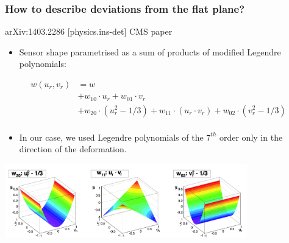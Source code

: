 \documentclass{beamer}
\begin{document}
\begin{frame}
  \frametitle{How to describe deviations from the flat plane?}

  \vspace{-0.3cm}
  \begin{block}{arXiv:1403.2286 [physics.ins-det] CMS paper}
    \begin{itemize}
      \item Sensor shape parametrised as a sum of products of modified Legendre polynomials:
    \end{itemize}
    \vspace{-0.2cm}
    \[
      \begin{array}{rl}
          w(u_r,v_r) &= w \\ 
                     &+ w_{10} \cdot u_r + w_{01} \cdot v_r \\ 
                     &+ w_{20} \cdot (u_r^2-1/3) + w_{11} \cdot (u_r \cdot v_r) + w_{02} \cdot (v_r^2 - 1/3) \\
      \end{array}
    \]
    \vspace{-0.5cm}
    \begin{itemize}
      \item In our case, we used Legendre polynomials of the $7^{th}$ order only in the direction of the deformation. 
    \end{itemize}
  \end{block}

  \vspace{-0.3cm}
  \begin{center}
    \includegraphics[width = 10.5cm]{Pictures/lagrangianPlynomials.png}
  \end{center} 

\end{frame}
\end{document}
